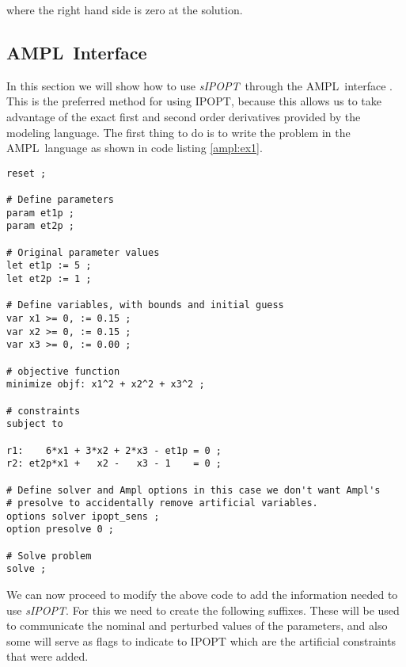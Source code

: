 \documentclass[letter, 11pt]{article}
\newcommand{\sensKKT}{\emph{sIPOPT}}
\newcommand{\AMPL}{AMPL}
\begin{document}
\noindent where the right hand side is zero at the solution.

\subsection{\AMPL\ Interface}

In this section we will show how to use \sensKKT\ through the \AMPL\ interface \cite{ampl}. This is the preferred method for using IPOPT,
because this allows us to take advantage of the exact first and second order derivatives provided by the modeling language.
The first thing to do is to write the problem in the \AMPL\ language as shown in code listing \ref{ampl:ex1}.

\begin{lstlisting}[language=ampl, caption={\AMPL\ code for Problem \ref{eq:exr}.}, label={ampl:ex1}, frame=single, captionpos=b]
reset ;

# Define parameters
param et1p ;
param et2p ;

# Original parameter values
let et1p := 5 ;
let et2p := 1 ;

# Define variables, with bounds and initial guess
var x1 >= 0, := 0.15 ;
var x2 >= 0, := 0.15 ;
var x3 >= 0, := 0.00 ;

# objective function
minimize objf: x1^2 + x2^2 + x3^2 ;

# constraints
subject to

r1:    6*x1 + 3*x2 + 2*x3 - et1p = 0 ;
r2: et2p*x1 +   x2 -   x3 - 1    = 0 ;

# Define solver and Ampl options in this case we don't want Ampl's
# presolve to accidentally remove artificial variables.
options solver ipopt_sens ;
option presolve 0 ;

# Solve problem
solve ;
\end{lstlisting}


We can now proceed to modify the above code to add the information needed to use \sensKKT.
For this we need to create the following suffixes. These will be used to communicate the nominal and perturbed values of the
parameters, and also some will serve as flags to indicate to IPOPT which are the artificial constraints that were added.
\end{document}
